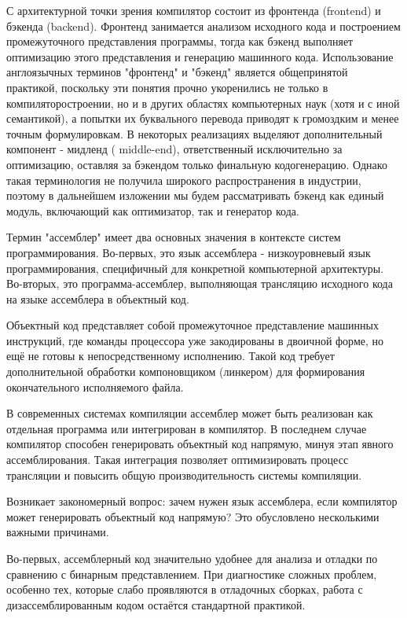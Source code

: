С архитектурной точки зрения компилятор состоит из фронтенда (frontend) и бэкенда (backend). Фронтенд занимается анализом исходного кода и построением промежуточного представления программы, тогда как бэкенд выполняет оптимизацию этого представления и генерацию машинного кода. Использование англоязычных терминов "фронтенд" и "бэкенд" является общепринятой практикой, поскольку эти понятия прочно укоренились не только в компиляторостроении, но и в других областях компьютерных наук (хотя и с иной семантикой), а попытки их буквального перевода приводят к громоздким и менее точным формулировкам. В некоторых реализациях выделяют дополнительный компонент - мидленд ( middle-end), ответственный исключительно за оптимизацию, оставляя за бэкендом только финальную кодогенерацию. Однако такая терминология не получила широкого распространения в индустрии, поэтому в дальнейшем изложении мы будем рассматривать бэкенд как единый модуль, включающий как оптимизатор, так и генератор кода.

Термин "ассемблер" имеет два основных значения в контексте систем программирования. Во-первых, это язык ассемблера - низкоуровневый язык программирования, специфичный для конкретной компьютерной архитектуры. Во-вторых, это программа-ассемблер, выполняющая трансляцию исходного кода на языке ассемблера в объектный код.

Объектный код представляет собой промежуточное представление машинных инструкций, где команды процессора уже закодированы в двоичной форме, но ещё не готовы к непосредственному исполнению. Такой код требует дополнительной обработки компоновщиком (линкером) для формирования окончательного исполняемого файла.

В современных системах компиляции ассемблер может быть реализован как отдельная программа или интегрирован в компилятор. В последнем случае компилятор способен генерировать объектный код напрямую, минуя этап явного ассемблирования. Такая интеграция позволяет оптимизировать процесс трансляции и повысить общую производительность системы компиляции.

Возникает закономерный вопрос: зачем нужен язык ассемблера, если компилятор может генерировать объектный код напрямую? Это обусловлено несколькими важными причинами.

Во-первых, ассемблерный код значительно удобнее для анализа и отладки по сравнению с бинарным представлением. При диагностике сложных проблем, особенно тех, которые слабо проявляются в отладочных сборках, работа с дизассемблированным кодом остаётся стандартной практикой.

